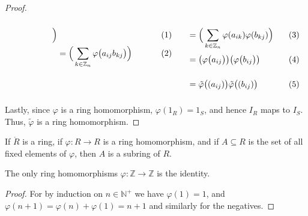 \documentclass{article}                                                        %
\begin{document}
\begin{proof}
\begin{subequations}
\begin{minipage}[t]{0.55\textwidth}
\begin{align}
                                    \Big)\\
                                &=\Big(\sum_{k\in\mathbb{Z}_{n}}
                                    \varphi\big(a_{ij}b_{kj}\big)\Big)
                            \end{align}
                        \end{minipage}
                        \hfill
                        \begin{minipage}[t]{0.44\textwidth}
                            \centering
                            \begin{align}
                                &=\Big(\sum_{k\in\mathbb{Z}_{n}}
                                    \varphi(a_{ik})\varphi(b_{kj})\Big)\\
                                &=\big(\varphi\big(a_{ij}\big)\big)
                                    \big(\varphi\big(b_{ij}\big)\big)
                                    \vphantom{\Big(\sum_{k\in\mathbb{Z}_{n}}}\\
                                &=\tilde{\varphi}\big((a_{ij})\big)
                                    \tilde{\varphi}\big((b_{ij})\big)
                                    \vphantom{\Big(\sum_{k\in\mathbb{Z}_{n}}}
                            \end{align}
                        \end{minipage}
                    \end{subequations}
                    Lastly, since $\varphi$ is a ring homomorphism,
                    $\varphi(1_{R})=1_{S}$, and hence $I_{R}$ maps to $I_{S}$.
                    Thus, $\tilde{\varphi}$ is a ring homomorphism.
                \end{proof}
                \begin{theorem}
                    If $\ring{R}$ is a ring, if $\varphi:R\rightarrow{R}$ is a
                    ring homomorphism, and if $A\subseteq{R}$ is the set of all
                    fixed elements of $\varphi$, then $A$ is a subring of $R$.
                \end{theorem}
                \begin{theorem}
                    The only ring homomorphisms
                    $\varphi:\mathbb{Z}\rightarrow\mathbb{Z}$ is the identity.
                \end{theorem}
                \begin{proof}
                    For by induction on $n\in\mathbb{N}^{+}$ we have
                    $\varphi(1)=1$, and $\varphi(n+1)=\varphi(n)+\varphi(1)=n+1$
                    and similarly for the negatives.
                \end{proof}
\end{document}

